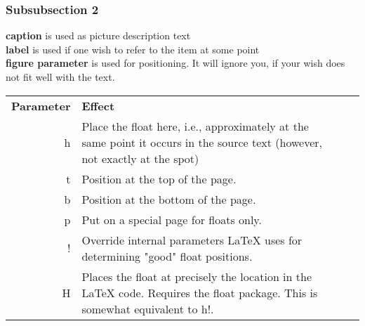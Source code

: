 \subsubsection{Subsubsection 2}
\textbf{caption} is used as picture description text\\
\textbf{label} is used if one wish to refer to the item at some point\\
\textbf{figure parameter} is used for positioning. It will ignore you, if your wish does not fit well with the text.\\
\begin{table*}[h!]\centering
  \begin{tabularx}{\textwidth}{@{}rXXl@{}}\toprule
    \textbf{Parameter} & \textbf{Effect}\\
    h & Place the float here, i.e., approximately at the same point it occurs in the source text (however, not exactly at the spot)\\
    t & Position at the top of the page.\\
    b & Position at the bottom of the page.\\
    p & Put on a special page for floats only.\\
    ! & Override internal parameters LaTeX uses for determining "good" float positions.\\
    H & Places the float at precisely the location in the LaTeX code. Requires the float package. This is somewhat equivalent to h!.\\
	\bottomrule
  \end{tabularx}
\end{table*}
\newpage